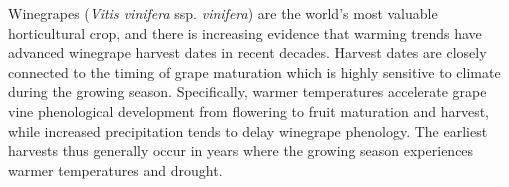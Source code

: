 \documentclass[final]{nature}
\begin{document}
\begin{abstract}
\end{abstract}
\noindent Winegrapes (\emph{Vitis vinifera} ssp. \emph{vinifera}) are the world's most valuable horticultural crop, and there is increasing evidence that warming trends have advanced winegrape harvest dates in recent decades\cite{Duchene:2005bd,Jones:2000br,schultzjones,Seguin2005,tomasi2011,odo2012,webb2012}. Harvest dates are closely connected to the timing of grape maturation which is highly sensitive to climate during the growing season. Specifically, warmer temperatures accelerate grape vine phenological development from flowering to fruit maturation and harvest, while increased precipitation tends to delay winegrape phenology\cite{jones2013}. The earliest harvests thus generally occur in years where the growing season experiences warmer temperatures and drought\cite{Jones:2000br}.\\
\end{document}
